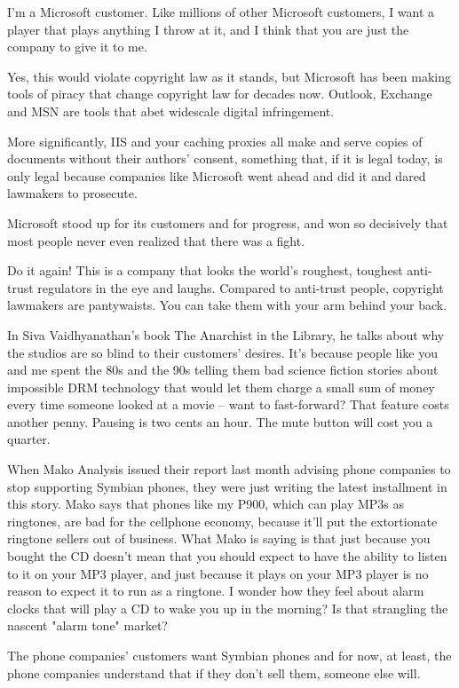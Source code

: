 I'm a Microsoft customer. Like millions of other Microsoft
customers, I want a player that plays anything I throw at it, and I
think that you are just the company to give it to me.

Yes, this would violate copyright law as it stands, but Microsoft
has been making tools of piracy that change copyright law for
decades now. Outlook, Exchange and MSN are tools that abet
widescale digital infringement.

More significantly, IIS and your caching proxies all make and serve
copies of documents without their authors' consent, something that,
if it is legal today, is only legal because companies like
Microsoft went ahead and did it and dared lawmakers to prosecute.

Microsoft stood up for its customers and for progress, and won so
decisively that most people never even realized that there was a
fight.

Do it again! This is a company that looks the world's roughest,
toughest anti-trust regulators in the eye and laughs. Compared to
anti-trust people, copyright lawmakers are pantywaists. You can
take them with your arm behind your back.

In Siva Vaidhyanathan's book The Anarchist in the Library, he talks
about why the studios are so blind to their customers' desires.
It's because people like you and me spent the 80s and the 90s
telling them bad science fiction stories about impossible DRM
technology that would let them charge a small sum of money every
time someone looked at a movie -- want to fast-forward? That
feature costs another penny. Pausing is two cents an hour. The mute
button will cost you a quarter.

When Mako Analysis issued their report last month advising phone
companies to stop supporting Symbian phones, they were just writing
the latest installment in this story. Mako says that phones like my
P900, which can play MP3s as ringtones, are bad for the cellphone
economy, because it'll put the extortionate ringtone sellers out of
business. What Mako is saying is that just because you bought the
CD doesn't mean that you should expect to have the ability to
listen to it on your MP3 player, and just because it plays on your
MP3 player is no reason to expect it to run as a ringtone. I wonder
how they feel about alarm clocks that will play a CD to wake you up
in the morning? Is that strangling the nascent "alarm tone"
market?

The phone companies' customers want Symbian phones and for now, at
least, the phone companies understand that if they don't sell them,
someone else will.

